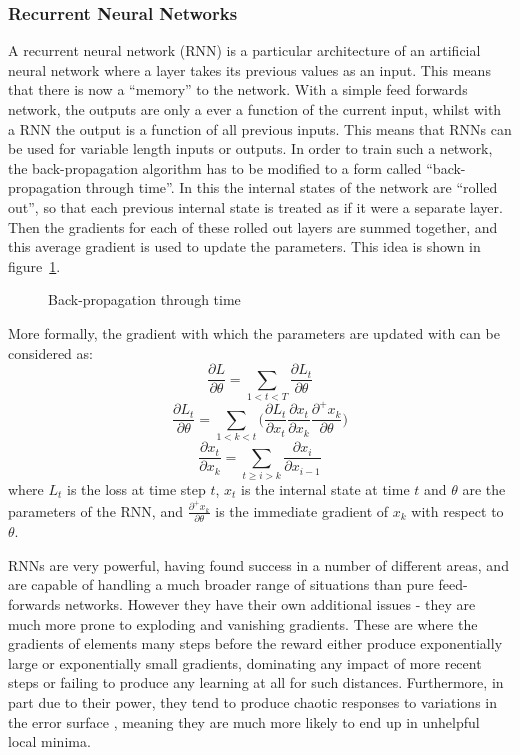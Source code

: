 \subsubsection{Recurrent Neural Networks}

A recurrent neural network (RNN) is a particular architecture of an artificial neural network where a layer takes its previous values as an input. This means that there is now a ``memory'' to the network. With a simple feed forwards network, the outputs are only a ever a function of the current input, whilst with a RNN the output is a function of all previous inputs. This means that RNNs can be used for variable length inputs or outputs. In order to train such a network, the back-propagation algorithm has to be modified to a form called ``back-propagation through time''. In this the internal states of the network are ``rolled out'', so that each previous internal state is treated as if it were a separate layer. Then the gradients for each of these rolled out layers are summed together, and this average gradient is used to update the parameters. This idea is shown in figure~\ref{fig:bptt}.

\begin{figure}
\centering

\caption{Back-propagation through time}
\label{fig:bptt}
\end{figure}
More formally, the gradient with which the parameters are updated with can be considered as:
\begin{equation}
\frac{\partial L}{\partial \theta} = \sum_{1<t<T}\frac{\partial L_t}{\partial\theta}
\end{equation}
\begin{equation}
\frac{\partial L_t}{\partial\theta} = \sum_{1 < k< t} \big( \frac{\partial L_t}{\partial x_t}\frac{\partial x_t}{\partial x_k} \frac{\partial^+ x_k}{\partial\theta} \big)
\end{equation}
\begin{equation}
\frac{\partial x_t}{\partial x_k} =\sum_{t \geq i > k} \frac{\partial x_i}{\partial x_{i-1}} 
\end{equation}
 where $L_t$ is the loss at time step $t$, $x_t$ is the internal state at time $t$ and $\theta$ are the parameters of the RNN, and $\frac{\partial^+ x_k}{\partial\theta}$ is the immediate gradient of $x_k$ with respect to $\theta$. 
 
RNNs are very powerful, having found success in a number of different areas, and are capable of handling a much broader range of situations than pure feed-forwards networks. However they have their own additional issues - they are much more prone to exploding and vanishing gradients. These are where the gradients of elements many steps before the reward either produce exponentially large or exponentially small gradients, dominating any impact of more recent steps or failing to produce any learning at all for such distances. Furthermore, in part due to their power, they tend to produce chaotic responses to variations in the error surface \cite{pascanu2012difficulty}, meaning they are much more likely to end up in unhelpful local minima.

